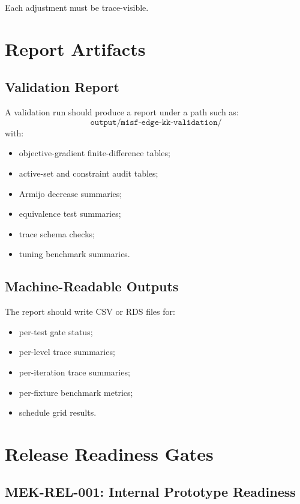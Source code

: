 \documentclass[11pt]{article}
\begin{document}
Each adjustment must be trace-visible.

\section{Report Artifacts}

\subsection{Validation Report}

A validation run should produce a report under a path such as:
\[
  \texttt{output/misf-edge-kk-validation/}
\]
with:
\begin{itemize}[leftmargin=2em]
  \item objective-gradient finite-difference tables;
  \item active-set and constraint audit tables;
  \item Armijo decrease summaries;
  \item equivalence test summaries;
  \item trace schema checks;
  \item tuning benchmark summaries.
\end{itemize}

\subsection{Machine-Readable Outputs}

The report should write CSV or RDS files for:
\begin{itemize}[leftmargin=2em]
  \item per-test gate status;
  \item per-level trace summaries;
  \item per-iteration trace summaries;
  \item per-fixture benchmark metrics;
  \item schedule grid results.
\end{itemize}

\section{Release Readiness Gates}

\subsection{MEK-REL-001: Internal Prototype Readiness}
\end{document}
